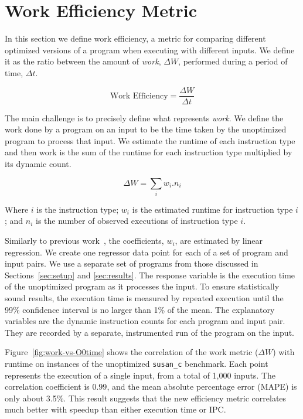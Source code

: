 \section{Work Efficiency Metric} \label{sec:metric}

    In this section we define work efficiency, a metric for comparing different optimized versions of a program when executing with
    different inputs. We define it as the ratio between the amount of \textit{work}, $\Delta W$, performed during a period of time, $\Delta
    t$.

    \[
       \textrm{Work Efficiency} = \frac{\Delta W}{\Delta t}
    \]

    The main challenge is to precisely define what represents \textit{work}. We define the work done by a program on an input to be the
    time taken by the unoptimized program to process that input. We estimate the runtime of each instruction type and then work is the sum
    of the runtime for each instruction type multiplied by its dynamic count.

    \[ \Delta W = \sum_i w_i.n_i \]

    Where $i$ is the instruction type; $w_i$ is the estimated runtime for instruction type $i$; and $n_i$ is the number of observed
    executions of instruction type $i$.

    Similarly to previous work~\citep{giusto01,powell09,brandolese11}, the coefficients, $w_i$, are estimated by linear regression. We create
    one regressor data point for each of a set of program and input pairs.
    We use a separate set of programs from those discussed in Sections~\ref{sec:setup} and \ref{sec:results}.
    The response variable is the execution time of the unoptimized program as it processes the input. To ensure
    statistically sound results, the execution time is measured by repeated execution until the 99\% confidence interval is no larger than 1\% of
    the mean. The explanatory variables are the dynamic instruction counts for each program and input pair. They are recorded by a separate,
    instrumented run of the program on the input.

    Figure~\ref{fig:work-vs-O0time} shows the correlation of the work metric ($\Delta W$) with runtime on instances of the unoptimized \texttt{susan\_c} benchmark.
    Each point represents the execution of a single input, from a total of 1,000 inputs.
    The correlation coefficient is $0.99$, and the mean absolute percentage error (MAPE) is only about 3.5\%.
    This result suggests that the new efficiency metric correlates much better with speedup than either execution time or IPC.

